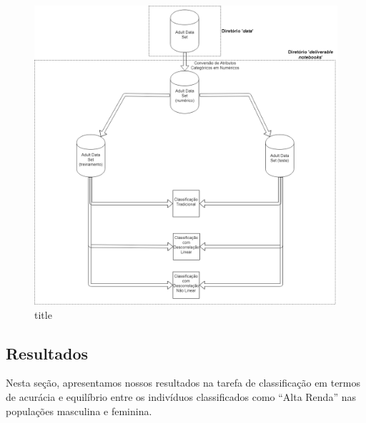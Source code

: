 \documentclass[11pt]{article}
\makeatletter
\def\maxwidth{\ifdim\Gin@nat@width>\linewidth\linewidth
    \else\Gin@nat@width\fi}
\let\Oldincludegraphics\includegraphics
\renewcommand{\includegraphics}[1]{\Oldincludegraphics[width=.8\maxwidth]{#1}}
\makeatother
\begin{document}
\begin{figure}
\centering
\includegraphics{../fig/WorkflowIA369.png}
\caption{title}
\end{figure}

    \hypertarget{resultados}{%
\subsection{Resultados}\label{resultados}}

Nesta seção, apresentamos nossos resultados na tarefa de classificação
em termos de acurácia e equilíbrio entre os indivíduos classificados
como ``Alta Renda'' nas populações masculina e feminina.
\end{document}
